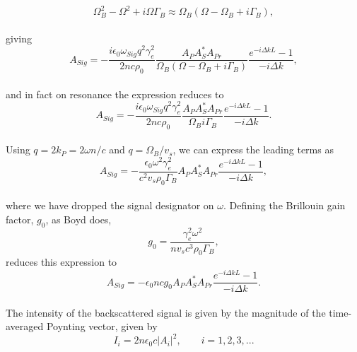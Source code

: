 \\
\begin{equation}
\Omega_{B}^{2} - \Omega^{2} + i\Omega\Gamma_{B} \approx \Omega_{B}(\Omega - \Omega_{B} + i\Gamma_{B}),
\end{equation}
\\
giving
\\
\begin{equation}
  A_{Sig} = -\frac{i\epsilon_{0}\omega_{Sig}q^{2}\gamma_{e}^{2}}{2nc\rho_{0}}\frac{A_{P}A_{S}^{*}A_{Pr}}{\Omega_{B}(\Omega - \Omega_{B} + i\Gamma_{B})} \frac{e^{-i\Delta kL} - 1}{-i\Delta k},
  \label{eq:resonance}
\end{equation}
\\
and in fact on resonance the expression reduces to
\\
\begin{equation}
  A_{Sig} = -\frac{i\epsilon_{0}\omega_{Sig}q^{2}\gamma_{e}^{2}}{2nc\rho_{0}}\frac{A_{P}A_{S}^{*}A_{Pr}}{\Omega_{B}i\Gamma_{B}} \frac{e^{-i\Delta kL} - 1}{-i\Delta k}.
\end{equation}
\\
Using \(q = 2k_{P} = 2\omega n/c\) and \(q = \Omega_{B}/v_{s}\), we can express the leading terms as
\\
\begin{equation}
  A_{Sig} = -\frac{\epsilon_{0}\omega^{2}\gamma_{e}^{2}}{c^{2}v_{s}\rho_{0}\Gamma_{B}}A_{P}A_{S}^{*}A_{Pr} \frac{e^{-i\Delta kL} - 1}{-i\Delta k},
\end{equation}
\\
where we have dropped the signal designator on \(\omega\). Defining the Brillouin gain factor, \(g_{0}\), as Boyd does,
\\
\begin{equation}
  g_{0} = \frac{\gamma_{e}^{2}\omega^{2}}{nv_{s}c^{3}\rho_{0}\Gamma_{B}},
\end{equation}
reduces this expression to
\\
\begin{equation}
  A_{Sig} = -\epsilon_{0}ncg_{0}A_{P}A_{S}^{*}A_{Pr} \frac{e^{-i\Delta kL} - 1}{-i\Delta k}.
\end{equation}
\\
The intensity of the backscattered signal is given by the magnitude of the time-averaged Poynting vector, given by
\\
\begin{equation}
  I_{i} = 2n\epsilon_{0}c|A_{i}|^{2}, \qquad i = 1,2,3,...
\end{equation}
\\
